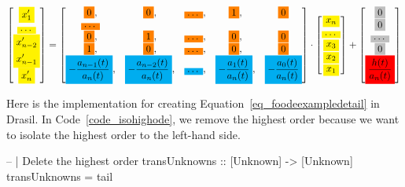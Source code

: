 \begin{equation}\label{eq_foodeexampledetail}
	\begin{bmatrix}
		\highlight{yellow}{x_{1}'} \\
    \highlight{yellow}{\dots} \\
    \highlight{yellow}{x_{n-2}'} \\
    \highlight{yellow}{x_{n-1}'} \\
    \highlight{yellow}{x_{n}'}
	\end{bmatrix}
    = 
  \begin{bmatrix}
		\highlight{orange}{0}, & \highlight{orange}{0}, & \highlight{orange}{\dots}, & \highlight{orange}{1}, & \highlight{orange}{0} \\
    \highlight{orange}{\dots} \\
    \highlight{orange}{0}, & \highlight{orange}{1}, & \highlight{orange}{\dots}, & \highlight{orange}{0}, & \highlight{orange}{0} \\
    \highlight{orange}{1}, & \highlight{orange}{0}, & \highlight{orange}{\dots}, & \highlight{orange}{0}, & \highlight{orange}{0} \\
    \highlight{cyan}{-\frac{a_{n-1}(t)}{a_n(t)}}, & \highlight{cyan}{-\frac{a_{n-2}(t)}{a_n(t)}}, & \highlight{cyan}{\dots}, & \highlight{cyan}{-\frac{a_{1}(t)}{a_n(t)}}, & \highlight{cyan}{-\frac{a_{0}(t)}{a_n(t)}}
	\end{bmatrix}
    \cdot
  \begin{bmatrix}
    \highlight{yellow}{x_{n}} \\
    \highlight{yellow}{\dots} \\
    \highlight{yellow}{x_{3}} \\
		\highlight{yellow}{x_{2}} \\
    \highlight{yellow}{x_{1}}
	\end{bmatrix}
    + 
  \begin{bmatrix}
    \highlight{lightgray}{0} \\
    \highlight{lightgray}{0} \\
    \highlight{lightgray}{\dots} \\
    \highlight{lightgray}{0} \\
    \highlight{red}{\frac{h(t)}{a_n(t)}}
	\end{bmatrix}
\end{equation}

Here is the implementation for creating Equation~\ref{eq_foodeexampledetail} in Drasil. In Code~\ref{code_isohighode}, we remove the highest order because we want to isolate the highest order to the left-hand side.
\begin{listing}[ht]
\begin{haskell1}
-- | Delete the highest order
transUnknowns :: [Unknown] -> [Unknown]
transUnknowns = tail
\end{haskell1}
\label{code_isohighode}
\end{listing}

